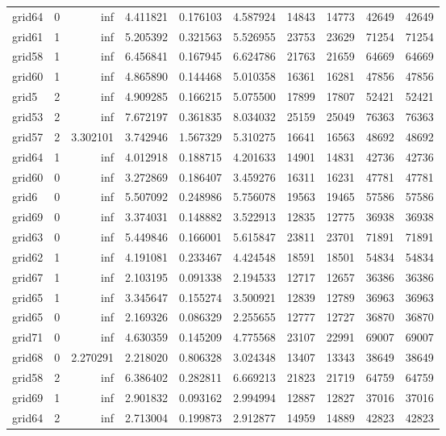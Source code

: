 \begin{longtable}{|l|r|r|r|r|r|r|r|r|r|}
grid64 & 0 & inf & 4.411821 & 0.176103 & 4.587924 & 14843 & 14773 & 42649 & 42649 \\
grid61 & 1 & inf & 5.205392 & 0.321563 & 5.526955 & 23753 & 23629 & 71254 & 71254 \\
grid58 & 1 & inf & 6.456841 & 0.167945 & 6.624786 & 21763 & 21659 & 64669 & 64669 \\
grid60 & 1 & inf & 4.865890 & 0.144468 & 5.010358 & 16361 & 16281 & 47856 & 47856 \\
grid5 & 2 & inf & 4.909285 & 0.166215 & 5.075500 & 17899 & 17807 & 52421 & 52421 \\
grid53 & 2 & inf & 7.672197 & 0.361835 & 8.034032 & 25159 & 25049 & 76363 & 76363 \\
grid57 & 2 & 3.302101 & 3.742946 & 1.567329 & 5.310275 & 16641 & 16563 & 48692 & 48692 \\
grid64 & 1 & inf & 4.012918 & 0.188715 & 4.201633 & 14901 & 14831 & 42736 & 42736 \\
grid60 & 0 & inf & 3.272869 & 0.186407 & 3.459276 & 16311 & 16231 & 47781 & 47781 \\
grid6 & 0 & inf & 5.507092 & 0.248986 & 5.756078 & 19563 & 19465 & 57586 & 57586 \\
grid69 & 0 & inf & 3.374031 & 0.148882 & 3.522913 & 12835 & 12775 & 36938 & 36938 \\
grid63 & 0 & inf & 5.449846 & 0.166001 & 5.615847 & 23811 & 23701 & 71891 & 71891 \\
grid62 & 1 & inf & 4.191081 & 0.233467 & 4.424548 & 18591 & 18501 & 54834 & 54834 \\
grid67 & 1 & inf & 2.103195 & 0.091338 & 2.194533 & 12717 & 12657 & 36386 & 36386 \\
grid65 & 1 & inf & 3.345647 & 0.155274 & 3.500921 & 12839 & 12789 & 36963 & 36963 \\
grid65 & 0 & inf & 2.169326 & 0.086329 & 2.255655 & 12777 & 12727 & 36870 & 36870 \\
grid71 & 0 & inf & 4.630359 & 0.145209 & 4.775568 & 23107 & 22991 & 69007 & 69007 \\
grid68 & 0 & 2.270291 & 2.218020 & 0.806328 & 3.024348 & 13407 & 13343 & 38649 & 38649 \\
grid58 & 2 & inf & 6.386402 & 0.282811 & 6.669213 & 21823 & 21719 & 64759 & 64759 \\
grid69 & 1 & inf & 2.901832 & 0.093162 & 2.994994 & 12887 & 12827 & 37016 & 37016 \\
grid64 & 2 & inf & 2.713004 & 0.199873 & 2.912877 & 14959 & 14889 & 42823 & 42823 \\

\end{longtable}
